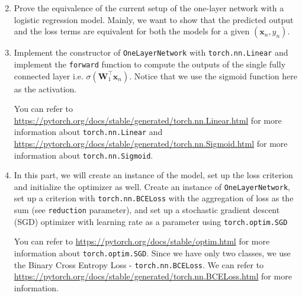 \begin{enumerate}
\setcounter{enumi}{1}

\item {}
Prove the equivalence of the current setup of the one-layer network with a logistic regression model. Mainly, we want to show that the predicted output and the loss terms are equivalent for both the models for a given $(\mathbf{x}_n, y_n)$.


\item {}
Implement the constructor of \verb|OneLayerNetwork| with \verb|torch.nn.Linear| and implement the \verb|forward| function to compute the outputs of the single fully connected layer i.e. $\sigma(\mathbf{W}_1^\top \mathbf{x}_n)$. Notice that we use the sigmoid function here as the activation.

You can refer to \url{https://pytorch.org/docs/stable/generated/torch.nn.Linear.html} for more information about \verb|torch.nn.Linear| and \url{https://pytorch.org/docs/stable/generated/torch.nn.Sigmoid.html} for more information about \verb|torch.nn.Sigmoid|.

\item {}
In this part, we will create an instance of the model, set up the loss criterion and initialize the optimizer as well. Create an instance of \verb|OneLayerNetwork|, set up a criterion with \verb|torch.nn.BCELoss| with the aggregation of loss as the sum (see \verb|reduction| parameter), and set up a stochastic gradient descent (SGD) optimizer with learning rate as a parameter using \verb|torch.optim.SGD| 

You can refer to \url{https://pytorch.org/docs/stable/optim.html} for more information about \verb|torch.optim.SGD|. Since we have only two classes, we use the Binary Cross Entropy Loss - \verb|torch.nn.BCELoss|. We can refer to \url{https://pytorch.org/docs/stable/generated/torch.nn.BCELoss.html} for more information.

\end{enumerate}

